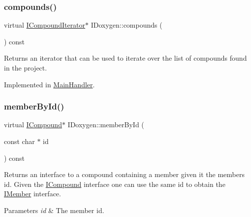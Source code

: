 \mbox{\label{class_i_doxygen_acdee4e3efe347f2d97363fdf80609e6e}} 
\subsubsection{\texorpdfstring{compounds()}{compounds()}\hspace{0.1cm}{\footnotesize\ttfamily [2/2]}}
{\footnotesize\ttfamily virtual \mbox{\hyperlink{class_i_compound_iterator}{I\+Compound\+Iterator}}$\ast$ I\+Doxygen\+::compounds (\begin{DoxyParamCaption}{ }\end{DoxyParamCaption}) const\hspace{0.3cm}{\ttfamily [pure virtual]}}

Returns an iterator that can be used to iterate over the list of compounds found in the project. 

Implemented in \mbox{\hyperlink{class_main_handler_a194b44299530605b43364905f2868158}{Main\+Handler}}.

\mbox{\label{class_i_doxygen_ac7544d8d1dd53c3a8d1e180d81bca0e9}} 
\subsubsection{\texorpdfstring{memberById()}{memberById()}\hspace{0.1cm}{\footnotesize\ttfamily [1/2]}}
{\footnotesize\ttfamily virtual \mbox{\hyperlink{class_i_compound}{I\+Compound}}$\ast$ I\+Doxygen\+::member\+By\+Id (\begin{DoxyParamCaption}\item[{const char $\ast$}]{id }\end{DoxyParamCaption}) const\hspace{0.3cm}{\ttfamily [pure virtual]}}

Returns an interface to a compound containing a member given it the member\textquotesingle{}s id. Given the \mbox{\hyperlink{class_i_compound}{I\+Compound}} interface one can use the same id to obtain the \mbox{\hyperlink{class_i_member}{I\+Member}} interface. 
\begin{DoxyParams}{Parameters}
{\em id} & The member id. \\
\hline
\end{DoxyParams}


